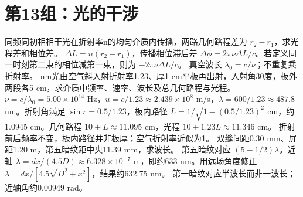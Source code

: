 \section{第13组：光的干涉}
\problemtext 同频同初相相干光在折射率n的均匀介质内传播，两路几何路程差为 $r_2-r_1$，求光程差和相位差。
\workings $\Delta L=n(r_2-r_1)$，传播相位滞后差 $\Delta\phi=2\pi\nu\Delta L/c$。若定义同一时刻第二束的相位减第一束，则为 $-2\pi\nu\Delta L/c$。
\crosscheck 真空波长 $\lambda_0=c/\nu$；不重复乘折射率。
 nm光由空气斜入射折射率1.23、厚1 cm平板再出射，入射角30度，板外两段各5 cm，求介质中频率、速率、波长及总几何路程与光程。
\workings $\nu=c/\lambda_0=5.00\times10^{14}$ Hz，$u=c/1.23\approx2.439\times10^8$ m/s，$\lambda=600/1.23\approx487.8$ nm。折射角满足 $\sin r=0.5/1.23$，板内路径 $L=1/\sqrt{1-(0.5/1.23)^2}$ cm，约1.0945 cm。几何路程 $10+L\approx11.095$ cm，光程 $10+1.23L\approx11.346$ cm。
\crosscheck 折射前后频率不变，板内路径并非板厚；空气折射率近似为1。
\problemtext 双缝间距0.30 mm、屏距1.20 m，第五暗纹距中央11.39 mm，求波长。
\workings 第五暗纹对应 $(5-1/2)\lambda$。近轴 $\lambda=dx/(4.5D)\approx6.328\times10^{-7}$ m，即约633 nm。用远场角度修正 $\lambda=d x/[4.5\sqrt{D^2+x^2}]$，结果约632.75 nm。
\crosscheck 第一暗纹对应半波长而非一波长；近轴角约0.00949 rad。

